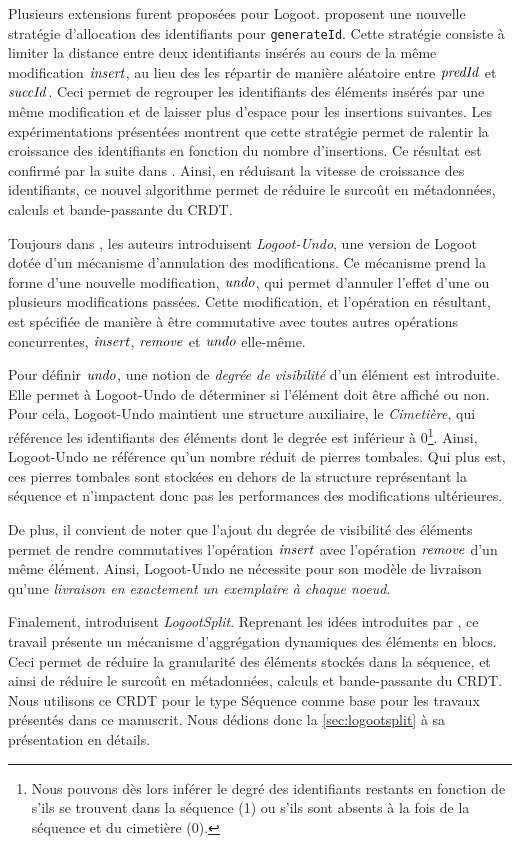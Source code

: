 Plusieurs extensions furent proposées pour Logoot.
\textcite{2010-logoot-undo-weiss} proposent une nouvelle stratégie d'allocation des identifiants pour \texttt{generateId}.
Cette stratégie consiste à limiter la distance entre deux identifiants insérés au cours de la même modification $\mathit{insert}$, au lieu des les répartir de manière aléatoire entre $\mathit{predId}$ et $\mathit{succId}$.
Ceci permet de regrouper les identifiants des éléments insérés par une même modification et de laisser plus d'espace pour les insertions suivantes.
Les expérimentations présentées montrent que cette stratégie permet de ralentir la croissance des identifiants en fonction du nombre d'insertions.
Ce résultat est confirmé par la suite dans \cite{2011-evaluation-crdts-ahmed-nacer}.
Ainsi, en réduisant la vitesse de croissance des identifiants, ce nouvel algorithme permet de réduire le surcoût en métadonnées, calculs et bande-passante du \ac{CRDT}.

Toujours dans \cite{2010-logoot-undo-weiss}, les auteurs introduisent \emph{Logoot-Undo}, une version de Logoot dotée d'un mécanisme d'annulation des modifications.
Ce mécanisme prend la forme d'une nouvelle modification, $\mathit{undo}$, qui permet d'annuler l'effet d'une ou plusieurs modifications passées.
Cette modification, et l'opération en résultant, est spécifiée de manière à être commutative avec toutes autres opérations concurrentes, \ie $\mathit{insert}$, $\mathit{remove}$ et $\mathit{undo}$ elle-même.

Pour définir $\mathit{undo}$, une notion de \emph{degrée de visibilité} d'un élément est introduite.
Elle permet à Logoot-Undo de déterminer si l'élément doit être affiché ou non.
Pour cela, Logoot-Undo maintient une structure auxiliaire, le \emph{Cimetière}, qui référence les identifiants des éléments dont le degrée est inférieur à 0\footnote{Nous pouvons dès lors inférer le degré des identifiants restants en fonction de s'ils se trouvent dans la séquence (1) ou s'ils sont absents à la fois de la séquence et du cimetière (0).}.
Ainsi, Logoot-Undo ne référence qu'un nombre réduit de pierres tombales.
Qui plus est, ces pierres tombales sont stockées en dehors de la structure représentant la séquence et n'impactent donc pas les performances des modifications ultérieures.

De plus, il convient de noter que l'ajout du degrée de visibilité des éléments permet de rendre commutatives l'opération $\mathit{insert}$ avec l'opération $\mathit{remove}$ d'un même élément.
Ainsi, Logoot-Undo ne nécessite pour son modèle de livraison qu'une \emph{livraison en exactement un exemplaire à chaque noeud}.

Finalement, \textcite{2013-logootsplit} introduisent \emph{LogootSplit}.
Reprenant les idées introduites par \cite{2012-string-wise}, ce travail présente un mécanisme d'aggrégation dynamiques des éléments en blocs.
Ceci permet de réduire la granularité des éléments stockés dans la séquence, et ainsi de réduire le surcoût en métadonnées, calculs et bande-passante du \ac{CRDT}.
Nous utilisons ce \ac{CRDT} pour le type Séquence comme base pour les travaux présentés dans ce manuscrit.
Nous dédions donc la \autoref{sec:logootsplit} à sa présentation en détails.

